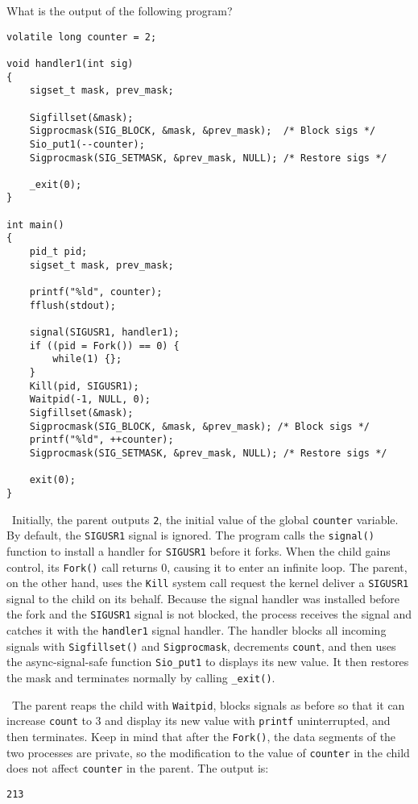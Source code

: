 \documentclass[12pt]{article}
\newenvironment{ex}[2][Exercise]{\begin{trivlist}
		\item[\hskip \labelsep {\bfseries #1}\hskip \labelsep {\bfseries #2.}]}{\end{trivlist}}
\newenvironment{sol}[1][Solution]{\begin{trivlist}
		\item[\hskip \labelsep {\bfseries #1:}]}{\end{trivlist}}
\begin{document}
\begin{ex}{8.8}
	What is the output of the following program?
	\begin{lstlisting}
volatile long counter = 2;

void handler1(int sig)
{
	sigset_t mask, prev_mask;
	
	Sigfillset(&mask);
	Sigprocmask(SIG_BLOCK, &mask, &prev_mask);	/* Block sigs */
	Sio_put1(--counter);
	Sigprocmask(SIG_SETMASK, &prev_mask, NULL); /* Restore sigs */
	
	_exit(0);
}

int main()
{
	pid_t pid;
	sigset_t mask, prev_mask;
	
	printf("%ld", counter);
	fflush(stdout);
	
	signal(SIGUSR1, handler1);
	if ((pid = Fork()) == 0) {
		while(1) {};
	}
	Kill(pid, SIGUSR1);
	Waitpid(-1, NULL, 0);
	Sigfillset(&mask);
	Sigprocmask(SIG_BLOCK, &mask, &prev_mask); /* Block sigs */
	printf("%ld", ++counter);
	Sigprocmask(SIG_SETMASK, &prev_mask, NULL); /* Restore sigs */
	
	exit(0);
}
	\end{lstlisting}
\end{ex}

\begin{sol}
	\
	Initially, the parent outputs \texttt{2}, the initial value of the global \texttt{counter} variable.
	By default, the \texttt{SIGUSR1} signal is ignored. The program calls the \texttt{signal()} function
	to install a handler for \texttt{SIGUSR1} before it forks. When the child gains control, its
	\texttt{Fork()} call returns 0, causing it to enter an infinite loop. The parent, on the other hand,
	uses the \texttt{Kill} system call request the kernel deliver a \texttt{SIGUSR1} signal to the child
	on its behalf. Because the signal handler was installed before the fork and the \texttt{SIGUSR1} signal is
	not blocked, the process receives the signal and catches it with the  \texttt{handler1} signal
	handler. The handler blocks all incoming signals with \texttt{Sigfillset()} and \texttt{Sigprocmask},
	decrements \texttt{count}, and then uses the async-signal-safe function \texttt{Sio\_put1} to
	displays its new value. It then restores the mask and terminates normally by calling \texttt{\_exit()}.
	
	\
	The parent reaps the child with \texttt{Waitpid}, blocks signals as before so that it can increase
	\texttt{count} to 3 and display its new value with \texttt{printf} uninterrupted, and then terminates.
	Keep in mind that after the \texttt{Fork()}, the data segments of the two processes are private, so
	the modification to the value of \texttt{counter} in the child does not affect \texttt{counter} in the
	parent. The output is:
	\begin{lstlisting}[language={}]
213
	\end{lstlisting}
\end{sol}
\end{document}
